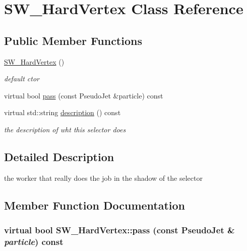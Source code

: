 \hypertarget{classSW__HardVertex}{
\section{SW\_\-Hard\-Vertex Class Reference}
\label{classSW__HardVertex}
}
\subsection*{Public Member Functions}
\begin{CompactItemize}
\item 
\hypertarget{classSW__HardVertex_b315a0b7a6dd6b2ba66f65d43e45dd4b}{
\hyperlink{classSW__HardVertex_b315a0b7a6dd6b2ba66f65d43e45dd4b}{SW\_\-Hard\-Vertex} ()}
\label{classSW__HardVertex_b315a0b7a6dd6b2ba66f65d43e45dd4b}

\begin{CompactList}\small\item\em default ctor \item\end{CompactList}\item 
virtual bool \hyperlink{classSW__HardVertex_f6b876c984917fdfb61010cc12d4c70a}{pass} (const Pseudo\-Jet \&particle) const 
\item 
\hypertarget{classSW__HardVertex_5cc6b45d66d3b5b762561b149fdbdfe5}{
virtual std::string \hyperlink{classSW__HardVertex_5cc6b45d66d3b5b762561b149fdbdfe5}{description} () const }
\label{classSW__HardVertex_5cc6b45d66d3b5b762561b149fdbdfe5}

\begin{CompactList}\small\item\em the description of wht this selector does \item\end{CompactList}\end{CompactItemize}


\subsection{Detailed Description}
the worker that really does the job in the shadow of the selector 



\subsection{Member Function Documentation}
\hypertarget{classSW__HardVertex_f6b876c984917fdfb61010cc12d4c70a}{
\subsubsection[pass]{\setlength{\rightskip}{0pt plus 5cm}virtual bool SW\_\-Hard\-Vertex::pass (const Pseudo\-Jet \& {\em particle}) const}}
\label{classSW__HardVertex_f6b876c984917fdfb61010cc12d4c70a}



